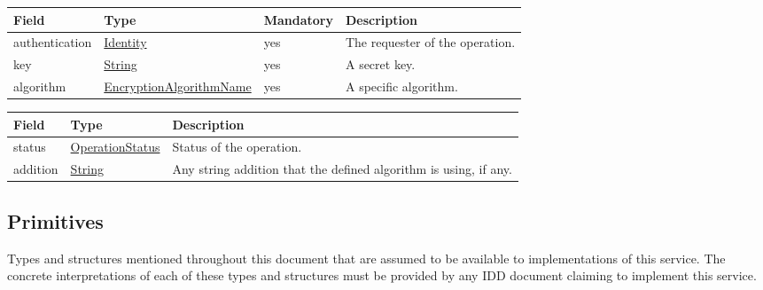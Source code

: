 \documentclass[a4paper]{arrowhead}
\newcommand{\pref}[1]{{\textcolor{ArrowheadGrey}{\hyperref[sec:model:primitives:#1]{#1}}}}
\begin{document}
\clearpage


\begin{table}[ht!]
\begin{tabularx}{\textwidth}{| p{3cm} | p{4.5cm} | p{2cm} | X |} \hline
\rowcolor{gray!33} Field & Type & Mandatory & Description \\ \hline
authentication & \hyperref[sec:model:Identity]{Identity} & yes & The requester of the operation. \\ \hline
key & \pref{String} & yes & A secret key. \\ \hline
algorithm & \pref{EncryptionAlgorithmName} & yes & A specific algorithm. \\ \hline
\end{tabularx}
\end{table}


\begin{table}[ht!]
\begin{tabularx}{\textwidth}{| p{4.25cm} | p{4.5cm} | X |} \hline
\rowcolor{gray!33} Field & Type & Description \\ \hline
status & \pref{OperationStatus} & Status of the operation. \\ \hline
addition & \pref{String} & Any string addition that the defined algorithm is using, if any. \\ \hline
\end{tabularx}
\end{table}

\newpage

\subsection{Primitives}
\label{sec:model:primitives}

Types and structures mentioned throughout this document that are assumed to be available to implementations of this service.
The concrete interpretations of each of these types and structures must be provided by any IDD document claiming to implement this service.
\end{document}
